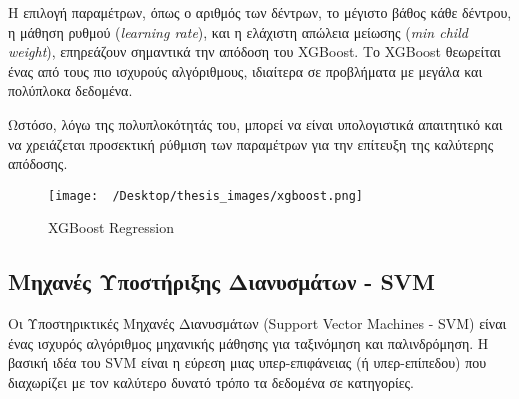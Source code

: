 \documentclass[diploma]{softlab-thesis}
\begin{document}
Η επιλογή παραμέτρων, όπως ο αριθμός των δέντρων, το μέγιστο βάθος κάθε δέντρου, η μάθηση ρυθμού (\textit{learning rate}), και η ελάχιστη απώλεια μείωσης (\textit{min child weight}), επηρεάζουν σημαντικά την απόδοση του XGBoost. Το XGBoost θεωρείται ένας από τους πιο ισχυρούς αλγόριθμους, ιδιαίτερα σε προβλήματα με μεγάλα και πολύπλοκα δεδομένα.

Ωστόσο, λόγω της πολυπλοκότητάς του, μπορεί να είναι υπολογιστικά απαιτητικό και να χρειάζεται προσεκτική ρύθμιση των παραμέτρων για την επίτευξη της καλύτερης απόδοσης.

\begin{figure}[H]
    \centering
    \texttt{[image: ~/Desktop/thesis\_images/xgboost.png]} %
    \caption{XGBoost Regression}
    \label{fig:your_image_label}
\end{figure}


\subsection{Μηχανές Υποστήριξης Διανυσμάτων - SVM}

Οι Υποστηρικτικές Μηχανές Διανυσμάτων (Support Vector Machines - SVM) είναι ένας ισχυρός αλγόριθμος μηχανικής μάθησης για ταξινόμηση και παλινδρόμηση. Η βασική ιδέα του SVM είναι η εύρεση μιας υπερ-επιφάνειας (ή υπερ-επίπεδου) που διαχωρίζει με τον καλύτερο δυνατό τρόπο τα δεδομένα σε κατηγορίες.
\end{document}
